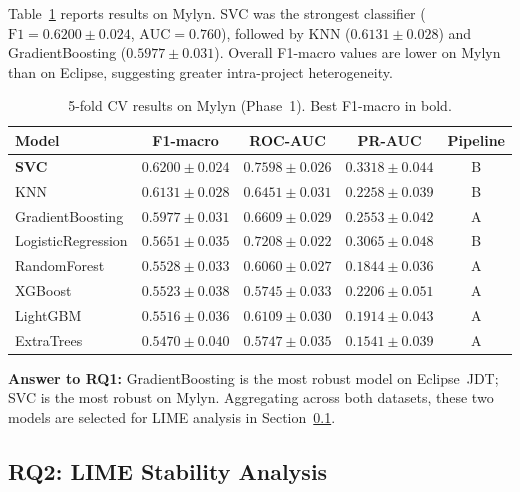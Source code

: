 \documentclass[12pt, a4paper]{article}
\newcommand{\RQ}[1]{\textbf{RQ#1}}
\newcommand{\model}[1]{\textsf{#1}}
\begin{document}
Table~\ref{tab:p1_mylyn} reports results on Mylyn. \model{SVC} was the
strongest classifier ($\text{F1}=0.6200 \pm 0.024$, $\text{AUC}=0.760$),
followed by \model{KNN} ($0.6131 \pm 0.028$) and \model{GradientBoosting}
($0.5977 \pm 0.031$). Overall F1-macro values are lower on Mylyn than on
Eclipse, suggesting greater intra-project heterogeneity.

\begin{table}[H]
\caption{5-fold CV results on Mylyn (Phase~1). Best F1-macro in bold.}
\label{tab:p1_mylyn}
\centering
\small
\renewcommand{\arraystretch}{1.2}
\begin{tabular}{@{}lcccc@{}}
\toprule
\textbf{Model} & \textbf{F1-macro} & \textbf{ROC-AUC}
  & \textbf{PR-AUC} & \textbf{Pipeline} \\
\midrule
\textbf{SVC}       & $\mathbf{0.6200 \pm 0.024}$ & $0.7598 \pm 0.026$
  & $0.3318 \pm 0.044$ & B \\
KNN                & $0.6131 \pm 0.028$ & $0.6451 \pm 0.031$
  & $0.2258 \pm 0.039$ & B \\
GradientBoosting   & $0.5977 \pm 0.031$ & $0.6609 \pm 0.029$
  & $0.2553 \pm 0.042$ & A \\
LogisticRegression & $0.5651 \pm 0.035$ & $0.7208 \pm 0.022$
  & $0.3065 \pm 0.048$ & B \\
RandomForest       & $0.5528 \pm 0.033$ & $0.6060 \pm 0.027$
  & $0.1844 \pm 0.036$ & A \\
XGBoost            & $0.5523 \pm 0.038$ & $0.5745 \pm 0.033$
  & $0.2206 \pm 0.051$ & A \\
LightGBM           & $0.5516 \pm 0.036$ & $0.6109 \pm 0.030$
  & $0.1914 \pm 0.043$ & A \\
ExtraTrees         & $0.5470 \pm 0.040$ & $0.5747 \pm 0.035$
  & $0.1541 \pm 0.039$ & A \\
\bottomrule
\end{tabular}
\end{table}

\noindent\textbf{Answer to \RQ{1}:} \model{GradientBoosting} is the most
robust model on Eclipse~JDT; \model{SVC} is the most robust on Mylyn.
Aggregating across both datasets, these two models are selected for LIME
analysis in Section~\ref{sec:lime_results}.

\subsection{RQ2: LIME Stability Analysis}
\label{sec:lime_results}
\end{document}
